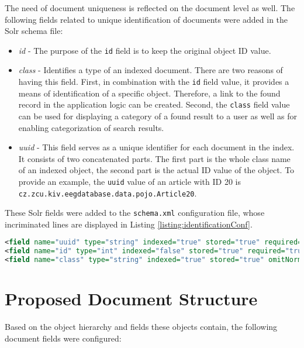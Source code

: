 The need of document uniqueness is reflected on the document level as well.
The following fields related to unique identification of documents were added in the Solr schema file:

\begin{itemize}
	\item \textit{id} - The purpose of the \texttt{id} field is to keep the original object ID value.
	\item \textit{class} - Identifies a type of an indexed document. There are two reasons of having this field. First, in combination with the \texttt{id} field value, it provides a means of identification of a specific object. Therefore, a link to the found record in the application logic can be created. Second, the \texttt{class} field value can be used for displaying a category of a found result to a user as well as for enabling categorization of search results.
	\item \textit{uuid} - This field serves as a unique identifier for each document in the index.
	It consists of two concatenated parts. The first part is the whole class name of an indexed object, the second part is the actual ID value of the object. To provide an example, the \texttt{uuid} value of an article with ID 20 is \texttt{cz.zcu.kiv.eegdatabase.data.pojo.Article20}. 
\end{itemize}

These Solr fields were added to the \texttt{schema.xml} configuration file, whose incriminated lines are displayed in Listing \ref{listing:identificationConf}.

\begin{lstlisting}[language=XML, caption={Configuration of Identification Fields in the Solr Schema.}, label={listing:identificationConf}]
<field name="uuid" type="string" indexed="true" stored="true" required="true" multiValued="false" />         
<field name="id" type="int" indexed="false" stored="true" required="true" multiValued="false" /> 
<field name="class" type="string" indexed="true" stored="true" omitNorms="true"/>
\end{lstlisting}

\section{Proposed Document Structure}

Based on the object hierarchy and fields these objects contain, the following document fields were configured:


